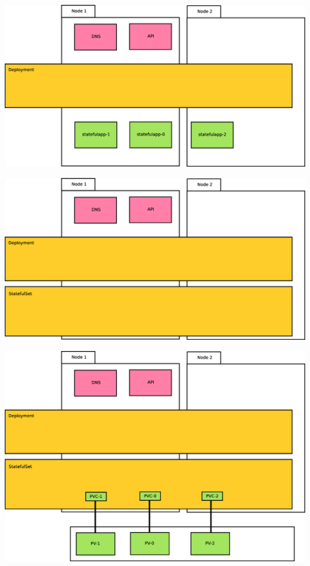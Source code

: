 \documentclass{beamer}
\begin{document}
\begin{frame}
\includegraphics[width=\textwidth,height=\textheight,keepaspectratio]{graphics/04-statefulAppPods.eps}
\end{frame}

\begin{frame}
\includegraphics[width=\textwidth,height=\textheight,keepaspectratio]{graphics/05-statefulSet.eps}
\end{frame}

\begin{frame}
\includegraphics[width=\textwidth,height=\textheight,keepaspectratio]{graphics/06-persistence.eps}
\end{frame}
\end{document}
